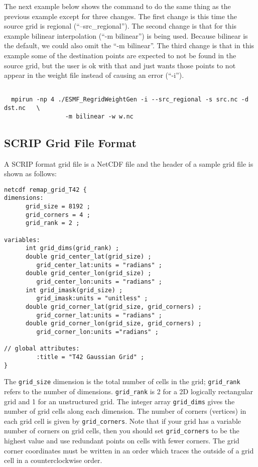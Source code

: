 The next example below shows the command to do the same thing as the previous example except for three changes. The first 
change is this time the source grid is regional (``--src\_regional''). The second change is that
for this example bilinear interpolation (``-m bilinear'') is being used. Because bilinear is the default, we could also
omit the ``-m bilinear''. The third change is that in this example some of the destination points are expected to
not be found in the source grid, but the user is ok with that and just wants those points to not appear in the weight file instead of causing an error (``-i''). 

\begin{verbatim}

  mpirun -np 4 ./ESMF_RegridWeightGen -i --src_regional -s src.nc -d dst.nc   \
                 -m bilinear -w w.nc

\end{verbatim}


\subsection{SCRIP Grid File Format}\label{sec:scripgridformat}

A SCRIP format grid file is a NetCDF file and the header of a sample grid file is shown as follows:

\begin{verbatim}
netcdf remap_grid_T42 {
dimensions:
      grid_size = 8192 ;
      grid_corners = 4 ;
      grid_rank = 2 ;

variables:
      int grid_dims(grid_rank) ;
      double grid_center_lat(grid_size) ;
         grid_center_lat:units = "radians" ;
      double grid_center_lon(grid_size) ;
         grid_center_lon:units = "radians" ;
      int grid_imask(grid_size) ;
         grid_imask:units = "unitless" ;
      double grid_corner_lat(grid_size, grid_corners) ;
         grid_corner_lat:units = "radians" ;
      double grid_corner_lon(grid_size, grid_corners) ;
         grid_corner_lon:units ="radians" ;

// global attributes:
         :title = "T42 Gaussian Grid" ;
}
\end{verbatim}

The {\tt grid\_size} dimension is the total number of cells in the grid; {\tt grid\_rank} refers to the
number of dimensions. {\tt grid\_rank} is 2 for a 2D logically rectangular grid and 1 for an 
unstructured grid. The integer array {\tt grid\_dims} gives the number of grid cells along each dimension. 
The number of corners (vertices) in each grid cell is given by {\tt grid\_corners}.
Note that if your grid has a variable number of corners on grid cells, then
you should set {\tt grid\_corners} to be the highest value and use redundant points
on cells with fewer corners. The grid corner coordinates must be
written in an order which traces the outside of a grid cell in a counterclockwise
order. 

